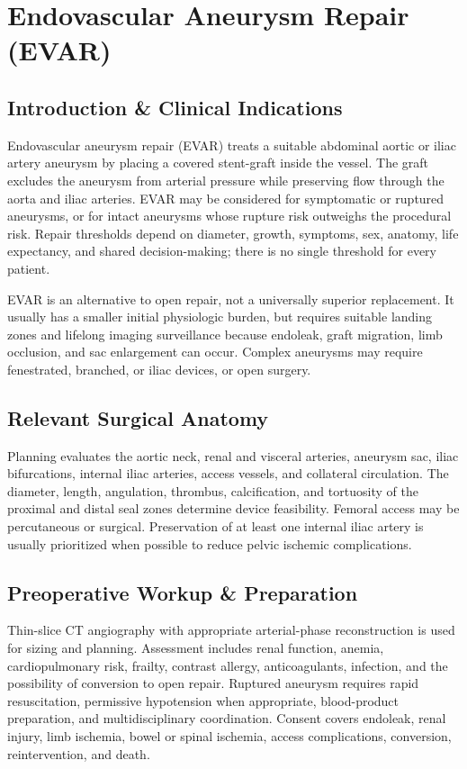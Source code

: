 \chapter{Endovascular Aneurysm Repair (EVAR)}

\section*{Introduction \& Clinical Indications}
Endovascular aneurysm repair (EVAR) treats a suitable abdominal aortic or iliac artery aneurysm by placing a covered stent-graft inside the vessel. The graft excludes the aneurysm from arterial pressure while preserving flow through the aorta and iliac arteries. EVAR may be considered for symptomatic or ruptured aneurysms, or for intact aneurysms whose rupture risk outweighs the procedural risk. Repair thresholds depend on diameter, growth, symptoms, sex, anatomy, life expectancy, and shared decision-making; there is no single threshold for every patient.

EVAR is an alternative to open repair, not a universally superior replacement. It usually has a smaller initial physiologic burden, but requires suitable landing zones and lifelong imaging surveillance because endoleak, graft migration, limb occlusion, and sac enlargement can occur. Complex aneurysms may require fenestrated, branched, or iliac devices, or open surgery.

\section*{Relevant Surgical Anatomy}
Planning evaluates the aortic neck, renal and visceral arteries, aneurysm sac, iliac bifurcations, internal iliac arteries, access vessels, and collateral circulation. The diameter, length, angulation, thrombus, calcification, and tortuosity of the proximal and distal seal zones determine device feasibility. Femoral access may be percutaneous or surgical. Preservation of at least one internal iliac artery is usually prioritized when possible to reduce pelvic ischemic complications.

\section*{Preoperative Workup \& Preparation}
Thin-slice CT angiography with appropriate arterial-phase reconstruction is used for sizing and planning. Assessment includes renal function, anemia, cardiopulmonary risk, frailty, contrast allergy, anticoagulants, infection, and the possibility of conversion to open repair. Ruptured aneurysm requires rapid resuscitation, permissive hypotension when appropriate, blood-product preparation, and multidisciplinary coordination. Consent covers endoleak, renal injury, limb ischemia, bowel or spinal ischemia, access complications, conversion, reintervention, and death.

